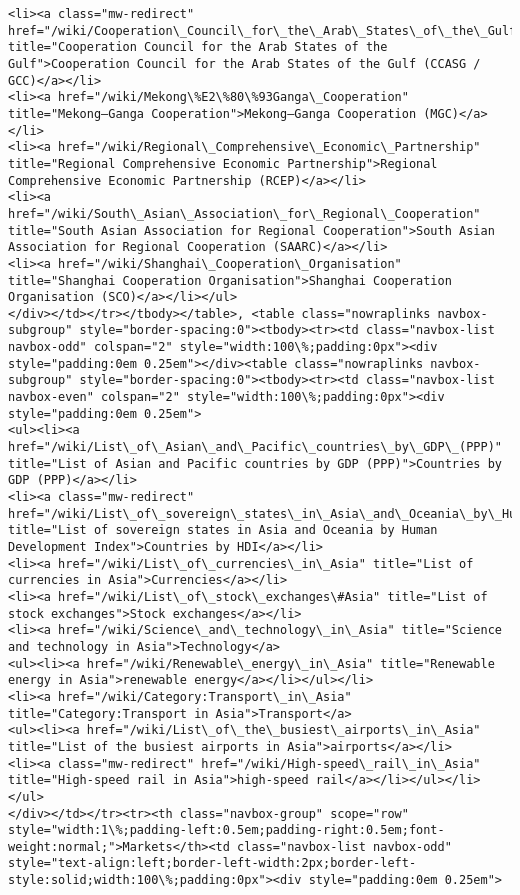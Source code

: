 \documentclass[11pt]{article}
\begin{document}
\begin{Verbatim}[commandchars=\\\{\}]
<li><a class="mw-redirect" href="/wiki/Cooperation\_Council\_for\_the\_Arab\_States\_of\_the\_Gulf" title="Cooperation Council for the Arab States of the Gulf">Cooperation Council for the Arab States of the Gulf (CCASG / GCC)</a></li>
<li><a href="/wiki/Mekong\%E2\%80\%93Ganga\_Cooperation" title="Mekong–Ganga Cooperation">Mekong–Ganga Cooperation (MGC)</a></li>
<li><a href="/wiki/Regional\_Comprehensive\_Economic\_Partnership" title="Regional Comprehensive Economic Partnership">Regional Comprehensive Economic Partnership (RCEP)</a></li>
<li><a href="/wiki/South\_Asian\_Association\_for\_Regional\_Cooperation" title="South Asian Association for Regional Cooperation">South Asian Association for Regional Cooperation (SAARC)</a></li>
<li><a href="/wiki/Shanghai\_Cooperation\_Organisation" title="Shanghai Cooperation Organisation">Shanghai Cooperation Organisation (SCO)</a></li></ul>
</div></td></tr></tbody></table>, <table class="nowraplinks navbox-subgroup" style="border-spacing:0"><tbody><tr><td class="navbox-list navbox-odd" colspan="2" style="width:100\%;padding:0px"><div style="padding:0em 0.25em"></div><table class="nowraplinks navbox-subgroup" style="border-spacing:0"><tbody><tr><td class="navbox-list navbox-even" colspan="2" style="width:100\%;padding:0px"><div style="padding:0em 0.25em">
<ul><li><a href="/wiki/List\_of\_Asian\_and\_Pacific\_countries\_by\_GDP\_(PPP)" title="List of Asian and Pacific countries by GDP (PPP)">Countries by GDP (PPP)</a></li>
<li><a class="mw-redirect" href="/wiki/List\_of\_sovereign\_states\_in\_Asia\_and\_Oceania\_by\_Human\_Development\_Index" title="List of sovereign states in Asia and Oceania by Human Development Index">Countries by HDI</a></li>
<li><a href="/wiki/List\_of\_currencies\_in\_Asia" title="List of currencies in Asia">Currencies</a></li>
<li><a href="/wiki/List\_of\_stock\_exchanges\#Asia" title="List of stock exchanges">Stock exchanges</a></li>
<li><a href="/wiki/Science\_and\_technology\_in\_Asia" title="Science and technology in Asia">Technology</a>
<ul><li><a href="/wiki/Renewable\_energy\_in\_Asia" title="Renewable energy in Asia">renewable energy</a></li></ul></li>
<li><a href="/wiki/Category:Transport\_in\_Asia" title="Category:Transport in Asia">Transport</a>
<ul><li><a href="/wiki/List\_of\_the\_busiest\_airports\_in\_Asia" title="List of the busiest airports in Asia">airports</a></li>
<li><a class="mw-redirect" href="/wiki/High-speed\_rail\_in\_Asia" title="High-speed rail in Asia">high-speed rail</a></li></ul></li></ul>
</div></td></tr><tr><th class="navbox-group" scope="row" style="width:1\%;padding-left:0.5em;padding-right:0.5em;font-weight:normal;">Markets</th><td class="navbox-list navbox-odd" style="text-align:left;border-left-width:2px;border-left-style:solid;width:100\%;padding:0px"><div style="padding:0em 0.25em">

\end{Verbatim}
\end{document}

